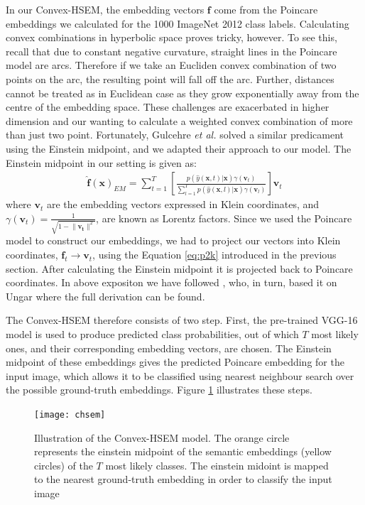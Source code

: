 \documentclass[12pt]{report}
\begin{document}
In our Convex-HSEM, the embedding vectors $\mathbf{f}$ come from the Poincare embeddings we calculated for the 1000 ImageNet 2012 class labels. Calculating convex combinations in hyperbolic space proves tricky, however. To see this, recall that due to constant negative curvature, straight lines in the Poincare model are arcs. Therefore if we take an Eucliden convex combination of two points on the arc, the resulting point will fall off the arc. Further, distances cannot be treated as in Euclidean case as they grow exponentially away from the centre of the embedding space. These challenges are exacerbated in higher dimension and our wanting to calculate a weighted convex combination of more than just two point. Fortunately, Gulcehre \textit{et al.} \cite{Gulcehre2018} solved a similar predicament using the Einstein midpoint, and we adapted their approach to our model. The Einstein midpoint in our setting is given as:
\begin{align*}
  \mathbf{\hat{f}(\mathbf{x})}_{EM} = \sum_{t=1}^T \left[\frac{p(\hat{y}(\mathbf{x}, t)|\mathbf{x})\gamma(\mathbf{v}_t)}{\sum_{l=1}^T p(\hat{y}(\mathbf{x}, l)|\mathbf{x})\gamma(\mathbf{v}_l)}\right]\mathbf{v}_t
\end{align*}
where $\mathbf{v}_t$ are the embedding vectors expressed in Klein coordinates, and  $\gamma(\mathbf{v}_t)=\frac{1}{\sqrt{1 - \lVert\mathbf{v_t}\rVert^2}}$, are known as Lorentz factors. Since we used the Poincare model to construct our embeddings, we had to project our vectors into Klein coordinates, $\mathbf{f}_t \rightarrow \mathbf{v}_t$, using the Equation \ref{eq:p2k} introduced in the previous section. After calculating the Einstein midpoint it is projected back to Poincare coordinates. In above expositon we have followed \cite{Gulcehre2018}, who, in turn, based it on Ungar \cite{Ungar2005} where the full derivation can be found. 

The Convex-HSEM therefore consists of two step. First, the pre-trained VGG-16 model is used to produce predicted class probabilities, out of which $T$ most likely ones, and their corresponding embedding vectors, are chosen. The Einstein midpoint of these embeddings gives the predicted Poincare embedding for the input image, which allows it to be classified using nearest neighbour search over the possible ground-truth embeddings. Figure \ref{fig:chsem} illustrates these steps. 

\begin{figure}
  \centering
  \texttt{[image: chsem]}
  \caption{Illustration of the Convex-HSEM model. The orange circle represents the einstein midpoint of the semantic embeddings (yellow circles) of the $T$ most likely classes. The einstein midoint is mapped to the nearest ground-truth embedding in order to classify the input image}
  \label{fig:chsem}
\end{figure}
\end{document}

